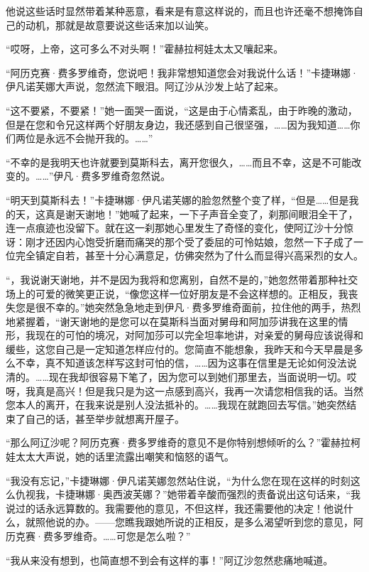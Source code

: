 \par 他说这些话时显然带着某种恶意，看来是有意这样说的，而且也许还毫不想掩饰自己的动机，那就是故意要说这些话来加以讪笑。
\par “哎呀，上帝，这可多么不对头啊！”霍赫拉柯娃太太又嚷起来。
\par “阿历克赛·费多罗维奇，您说吧！我非常想知道您会对我说什么话！”卡捷琳娜·伊凡诺芙娜大声说，忽然流下眼泪。阿辽沙从沙发上站了起来。
\par “这不要紧，不要紧！”她一面哭一面说，“这是由于心情紊乱，由于昨晚的激动，但是在您和令兄这样两个好朋友身边，我还感到自己很坚强，……因为我知道……你们两位是永远不会抛开我的。……”
\par “不幸的是我明天也许就要到莫斯科去，离开您很久，……而且不幸，这是不可能改变的。……”伊凡·费多罗维奇忽然说。
\par “明天到莫斯科去！”卡捷琳娜·伊凡诺芙娜的脸忽然整个变了样，“但是……但是我的天，这真是谢天谢地！”她喊了起来，一下子声音全变了，刹那间眼泪全干了，连一点痕迹也没留下。就在这一刹那她心里发生了奇怪的变化，使阿辽沙十分惊讶：刚才还因内心饱受折磨而痛哭的那个受了委屈的可怜姑娘，忽然一下子成了一位完全镇定自若，甚至十分心满意足，仿佛突然为了什么而显得兴高采烈的女人。
\par “，我说谢天谢地，并不是因为我将和您离别，自然不是的，”她忽然带着那种社交场上的可爱的微笑更正说，“像您这样一位好朋友是不会这样想的。正相反，我丧失您是很不幸的。”她突然急急地走到伊凡·费多罗维奇面前，拉住他的两手，热烈地紧握着，“谢天谢地的是您可以在莫斯科当面对舅母和阿加莎讲我在这里的情形，我现在的可怕的境况，对阿加莎可以完全坦率地讲，对亲爱的舅母应该说得和缓些，这您自己是一定知道怎样应付的。您简直不能想象，我昨天和今天早晨是多么不幸，真不知道该怎样写这封可怕的信，……因为这事在信里是无论如何没法说清的。……现在我却很容易下笔了，因为您可以到她们那里去，当面说明一切。哎呀，我真是高兴！但是我只是为这一点感到高兴，我再一次请您相信我的话。当然您本人的离开，在我来说是别人没法抵补的。……我现在就跑回去写信。”她突然结束了自己的话，甚至举步就想离开屋子。
\par “那么阿辽沙呢？阿历克赛·费多罗维奇的意见不是你特别想倾听的么？”霍赫拉柯娃太太大声说，她的话里流露出嘲笑和恼怒的语气。
\par “我没有忘记，”卡捷琳娜·伊凡诺芙娜忽然站住说，“为什么您在现在这样的时刻这么仇视我，卡捷琳娜·奥西波芙娜？”她带着辛酸而强烈的责备说出这句话来，“我说过的话永远算数的。我需要他的意见，不但这样，我还需要他的决定！他说什么，就照他说的办。——您瞧我跟她所说的正相反，是多么渴望听到您的意见，阿历克赛·费多罗维奇。……可您是怎么啦？”
\par “我从来没有想到，也简直想不到会有这样的事！”阿辽沙忽然悲痛地喊道。
